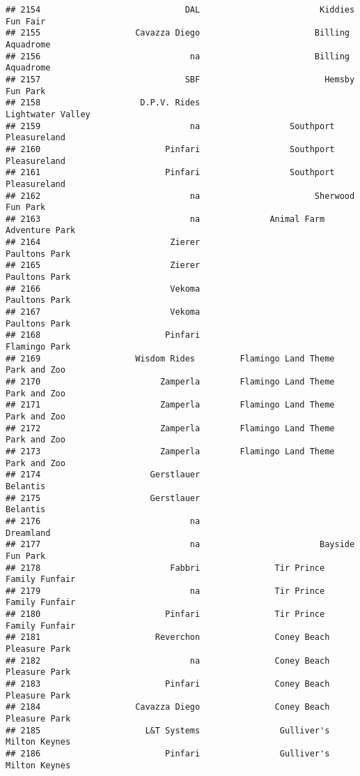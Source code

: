 \documentclass[
]{article}
\begin{document}
\begin{verbatim}
## 2154                             DAL                        Kiddies Fun Fair
## 2155                   Cavazza Diego                       Billing Aquadrome
## 2156                              na                       Billing Aquadrome
## 2157                             SBF                         Hemsby Fun Park
## 2158                    D.P.V. Rides                       Lightwater Valley
## 2159                              na                  Southport Pleasureland
## 2160                         Pinfari                  Southport Pleasureland
## 2161                         Pinfari                  Southport Pleasureland
## 2162                              na                       Sherwood Fun Park
## 2163                              na              Animal Farm Adventure Park
## 2164                          Zierer                           Paultons Park
## 2165                          Zierer                           Paultons Park
## 2166                          Vekoma                           Paultons Park
## 2167                          Vekoma                           Paultons Park
## 2168                         Pinfari                           Flamingo Park
## 2169                   Wisdom Rides         Flamingo Land Theme Park and Zoo
## 2170                        Zamperla        Flamingo Land Theme Park and Zoo
## 2171                        Zamperla        Flamingo Land Theme Park and Zoo
## 2172                        Zamperla        Flamingo Land Theme Park and Zoo
## 2173                        Zamperla        Flamingo Land Theme Park and Zoo
## 2174                      Gerstlauer                                Belantis
## 2175                      Gerstlauer                                Belantis
## 2176                              na                               Dreamland
## 2177                              na                        Bayside Fun Park
## 2178                          Fabbri               Tir Prince Family Funfair
## 2179                              na               Tir Prince Family Funfair
## 2180                         Pinfari               Tir Prince Family Funfair
## 2181                       Reverchon               Coney Beach Pleasure Park
## 2182                              na               Coney Beach Pleasure Park
## 2183                         Pinfari               Coney Beach Pleasure Park
## 2184                   Cavazza Diego               Coney Beach Pleasure Park
## 2185                     L&T Systems                Gulliver's Milton Keynes
## 2186                         Pinfari                Gulliver's Milton Keynes

\end{verbatim}
\end{document}
